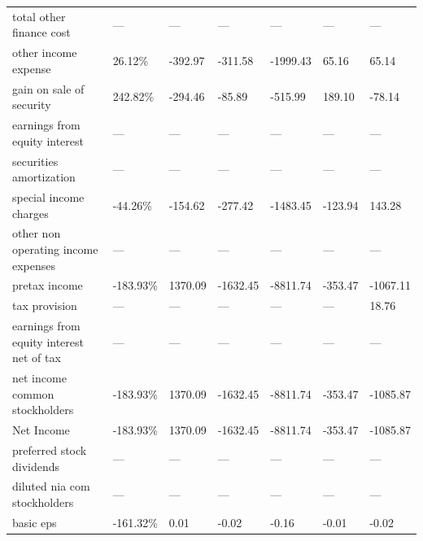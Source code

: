 \begin{table}[]
{\begin{tabular}{@{}lllllll@{}}
total other finance cost                                      & —          & —         & —         & —        & —        & —        \\
other income expense                                          & 26.12\%    & -392.97   & -311.58   & -1999.43 & 65.16    & 65.14    \\
gain on sale of security                                      & 242.82\%   & -294.46   & -85.89    & -515.99  & 189.10   & -78.14   \\
earnings from equity interest                                 & —          & —         & —         & —        & —        & —        \\
securities amortization                                       & —          & —         & —         & —        & —        & —        \\
special income charges                                        & -44.26\%   & -154.62   & -277.42   & -1483.45 & -123.94  & 143.28   \\
other non operating income expenses                           & —          & —         & —         & —        & —        & —        \\
pretax income                                                 & -183.93\%  & 1370.09   & -1632.45  & -8811.74 & -353.47  & -1067.11 \\
tax provision                                                 & —          & —         & —         & —        & —        & 18.76    \\
earnings from equity interest net of tax                      & —          & —         & —         & —        & —        & —        \\
net income common stockholders                                & -183.93\%  & 1370.09   & -1632.45  & -8811.74 & -353.47  & -1085.87 \\
Net Income                                                    & -183.93\%  & 1370.09   & -1632.45  & -8811.74 & -353.47  & -1085.87 \\
preferred stock dividends                                     & —          & —         & —         & —        & —        & —        \\
diluted nia com stockholders                                  & —          & —         & —         & —        & —        & —        \\
basic eps                                                     & -161.32\%  & 0.01      & -0.02     & -0.16    & -0.01    & -0.02    \\

\end{tabular}}
\end{table}
